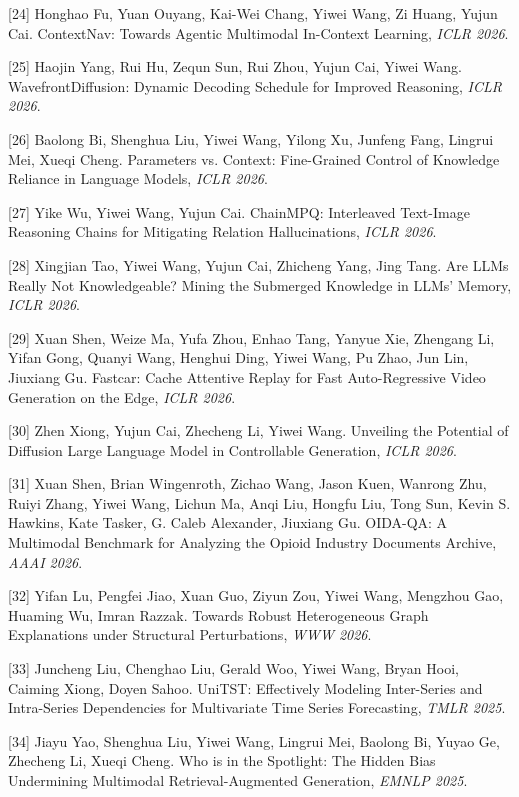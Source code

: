 [24] Honghao Fu, Yuan Ouyang, Kai-Wei Chang, Yiwei Wang, Zi Huang, Yujun Cai. ContextNav: Towards Agentic Multimodal In-Context Learning, \textit{ICLR 2026}.

[25] Haojin Yang, Rui Hu, Zequn Sun, Rui Zhou, Yujun Cai, Yiwei Wang. WavefrontDiffusion: Dynamic Decoding Schedule for Improved Reasoning, \textit{ICLR 2026}.

[26] Baolong Bi, Shenghua Liu, Yiwei Wang, Yilong Xu, Junfeng Fang, Lingrui Mei, Xueqi Cheng. Parameters vs. Context: Fine-Grained Control of Knowledge Reliance in Language Models, \textit{ICLR 2026}.

[27] Yike Wu, Yiwei Wang, Yujun Cai. ChainMPQ: Interleaved Text-Image Reasoning Chains for Mitigating Relation Hallucinations, \textit{ICLR 2026}.

[28] Xingjian Tao, Yiwei Wang, Yujun Cai, Zhicheng Yang, Jing Tang. Are LLMs Really Not Knowledgeable? Mining the Submerged Knowledge in LLMs' Memory, \textit{ICLR 2026}.

[29] Xuan Shen, Weize Ma, Yufa Zhou, Enhao Tang, Yanyue Xie, Zhengang Li, Yifan Gong, Quanyi Wang, Henghui Ding, Yiwei Wang, Pu Zhao, Jun Lin, Jiuxiang Gu. Fastcar: Cache Attentive Replay for Fast Auto-Regressive Video Generation on the Edge, \textit{ICLR 2026}.

[30] Zhen Xiong, Yujun Cai, Zhecheng Li, Yiwei Wang. Unveiling the Potential of Diffusion Large Language Model in Controllable Generation, \textit{ICLR 2026}.

[31] Xuan Shen, Brian Wingenroth, Zichao Wang, Jason Kuen, Wanrong Zhu, Ruiyi Zhang, Yiwei Wang, Lichun Ma, Anqi Liu, Hongfu Liu, Tong Sun, Kevin S. Hawkins, Kate Tasker, G. Caleb Alexander, Jiuxiang Gu. OIDA-QA: A Multimodal Benchmark for Analyzing the Opioid Industry Documents Archive, \textit{AAAI 2026}.

[32] Yifan Lu, Pengfei Jiao, Xuan Guo, Ziyun Zou, Yiwei Wang, Mengzhou Gao, Huaming Wu, Imran Razzak. Towards Robust Heterogeneous Graph Explanations under Structural Perturbations, \textit{WWW 2026}.

[33] Juncheng Liu, Chenghao Liu, Gerald Woo, Yiwei Wang, Bryan Hooi, Caiming Xiong, Doyen Sahoo. UniTST: Effectively Modeling Inter-Series and Intra-Series Dependencies for Multivariate Time Series Forecasting, \textit{TMLR 2025}.

[34] Jiayu Yao, Shenghua Liu, Yiwei Wang, Lingrui Mei, Baolong Bi, Yuyao Ge, Zhecheng Li, Xueqi Cheng. Who is in the Spotlight: The Hidden Bias Undermining Multimodal Retrieval-Augmented Generation, \textit{EMNLP 2025}.

